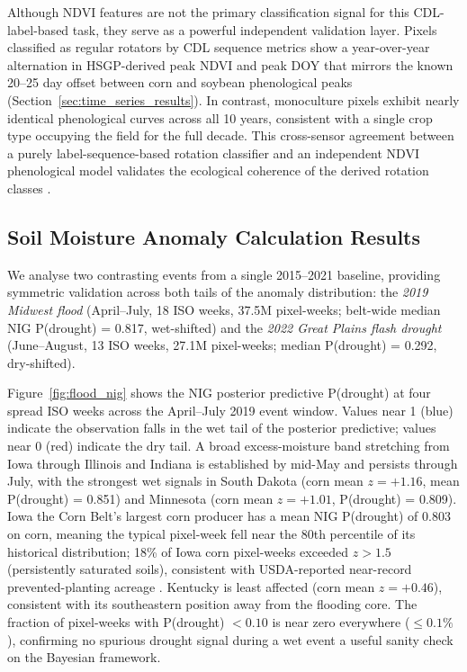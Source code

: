 \documentclass{article}
\begin{document}
Although NDVI features are not the primary classification signal for this
CDL-label-based task, they serve as a powerful independent validation layer.
Pixels classified as regular rotators by CDL sequence metrics show a
year-over-year alternation in HSGP-derived peak NDVI and peak DOY
that mirrors the known 20--25 day offset between corn and soybean phenological
peaks (Section~\ref{sec:time_series_results}).
In contrast, monoculture pixels exhibit nearly identical phenological curves
across all 10 years, consistent with a single crop type occupying the field for
the full decade.
This cross-sensor agreement between a purely label-sequence-based rotation
classifier and an independent NDVI phenological model validates the
ecological coherence of the derived rotation classes
\citep{zeng2016hybrid,nandan2026rotation}.

\subsection{Soil Moisture Anomaly Calculation Results}
\label{sec:anomaly_results}

We analyse two contrasting events from a single 2015--2021 baseline,
providing symmetric validation across both tails of the anomaly
distribution: the \textit{2019 Midwest flood} (April--July, 18 ISO
weeks, 37.5M pixel-weeks; belt-wide median NIG P(drought) = 0.817,
wet-shifted) and the \textit{2022 Great Plains flash drought}
(June--August, 13 ISO weeks, 27.1M pixel-weeks; median P(drought) =
0.292, dry-shifted).

Figure~\ref{fig:flood_nig} shows the NIG posterior predictive P(drought)
at four spread ISO weeks across the April--July 2019 event window.
Values near 1 (blue) indicate the observation falls in the wet tail of
the posterior predictive; values near 0 (red) indicate the dry tail.
A broad excess-moisture band stretching from Iowa through Illinois and
Indiana is established by mid-May and persists through July, with the
strongest wet signals in South Dakota (corn mean $z = +1.16$, mean
P(drought) = 0.851) and Minnesota (corn mean $z = +1.01$,
P(drought) = 0.809).
Iowa the Corn Belt's largest corn producer has a mean NIG
P(drought) of 0.803 on corn, meaning the typical pixel-week fell near
the 80th percentile of its historical distribution; 18\% of Iowa corn
pixel-weeks exceeded $z > 1.5$ (persistently saturated soils),
consistent with USDA-reported near-record prevented-planting acreage
\citep{pal2020flood}.
Kentucky is least affected (corn mean $z = +0.46$), consistent with its
southeastern position away from the flooding core.
The fraction of pixel-weeks with P(drought) $< 0.10$ is near zero
everywhere ($\leq 0.1\%$), confirming no spurious drought signal during
a wet event a useful sanity check on the Bayesian framework.
\end{document}
